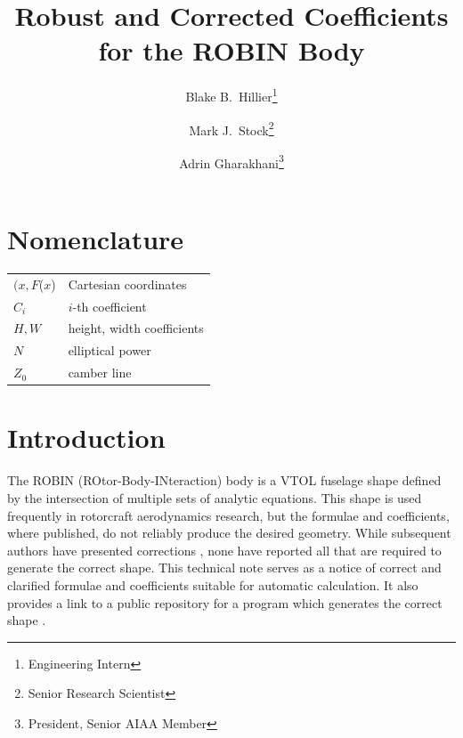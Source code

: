 \documentclass[journal]{new-aiaa}
\title{Robust and Corrected Coefficients for the ROBIN Body}
\author{Blake B.~Hillier\footnote{Engineering Intern}}
\author{Mark J.~Stock\footnote{Senior Research Scientist}}
\author{Adrin Gharakhani\footnote{President, Senior AIAA Member}}
\affil{Applied Scientific Research, Inc.\\ Irvine, CA}
\begin{document}
\maketitle


\section*{Nomenclature}

{\renewcommand\arraystretch{1.0}
\noindent\begin{longtable*}{@{}l @{\quad=\quad} l@{}}
$(x, F$($x$)  & Cartesian coordinates \\
$C_{i}$ &    $i$-th coefficient \\
$H,W$ &    height, width coefficients \\
$N$ &    elliptical power \\
$Z_{0}$ &    camber line \\
\end{longtable*}}


\section{Introduction}
The ROBIN (ROtor-Body-INteraction) body is a VTOL fuselage shape \cite{nasa87762,mineckgorton,nasa80051,nasa1999}
defined by the intersection of multiple sets of analytic equations.
This shape is used frequently in rotorcraft aerodynamics research, but the formulae and
coefficients, where published, do not reliably produce the desired geometry.
While subsequent authors have presented corrections \cite{nasa87762,mineckgorton},
none have reported all that are required to generate the correct shape.
This technical note serves as a notice of correct and clarified formulae and coefficients
suitable for automatic calculation. It also provides a link to a public repository
for a program which generates the correct shape \cite{robinsurfmesh}.

\end{document}
